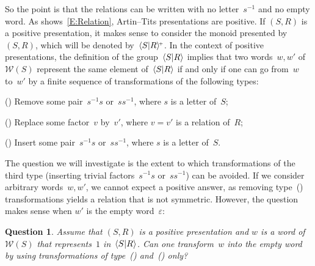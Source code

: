 \documentclass{amsart}
\numberwithin{equation}{section}
\theoremstyle{plain}
\newtheorem{ques}[prop]{Question}
\theoremstyle{definition}
\newcounter{ITEM}
\begin{document}
So the point is that the relations can be written with no letter~${s}{^{-1}}$ and no empty word. As shows~\eqref{E:Relation}, Artin--Tits presentations are positive. If $({S}, {R})$ is a positive presentation, it makes sense to consider the monoid presented by~$({S}, {R})$, which will be denoted by~${\langle{S}{\mid}\nobreak{R}\rangle^{\!\scriptscriptstyle+}}$. In the context of positive presentations, the definition of the group~${\langle{S}{\mid}\nobreak{R}\rangle}$ implies that two words~${w}, {w}'$ of~${\mathcal{W}({S})}$ represent the same element of~${\langle{S}{\mid}\nobreak{R}\rangle}$ if and only if one can go from~${w}$ to~${w}'$ by a finite sequence of transformations of the following types:

{\setcounter{ITEM}{1}\leavevmode\hbox{\rm()}} Remove some pair~${s}{^{-1}} {s}$ or~${s} {s}{^{-1}} $, where ${s}$ is a letter of~${S}$;

{\setcounter{ITEM}{2}\leavevmode\hbox{\rm()}} Replace some factor~${v}$ by~${v}'$, where ${v} = {v}'$ is a relation of~${R}$;

{\setcounter{ITEM}{3}\leavevmode\hbox{\rm()}} Insert some pair~${s}{^{-1}} {s}$ or~${s} {s}{^{-1}} $, where ${s}$ is a letter of~${S}$.

\noindent The question we will investigate is the extent to which transformations of the third type (inserting trivial factors~${s}{^{-1}} {s}$ or~${s} {s}{^{-1}} $) can be avoided. If we consider arbitrary words~${w}, {w}'$, we cannot expect a positive answer, as removing type~{\setcounter{ITEM}{3}\leavevmode\hbox{\rm()}} transformations yields a relation that is not symmetric. However, the question makes sense when ${w}'$ is the empty word~${\varepsilon}$:

\begin{ques}
\label{Q:Naive}
Assume that $({S}, {R})$ is a positive presentation and ${w}$ is a word of~${\mathcal{W}({S})}$ that represents~$1$ in~${\langle{S}{\mid}\nobreak{R}\rangle}$. Can one transform~${w}$ into the empty word by using transformations of type~{\setcounter{ITEM}{1}\leavevmode\hbox{\rm()}} and~{\setcounter{ITEM}{2}\leavevmode\hbox{\rm()}} only?
\end{ques}
\end{document}

